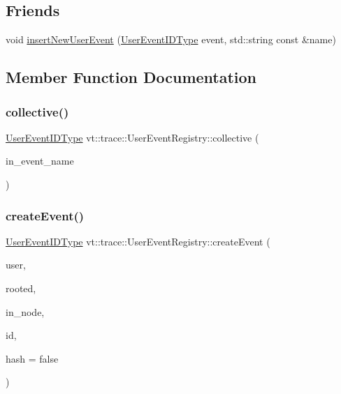 \subsection*{Friends}
\begin{DoxyCompactItemize}
\item 
void \hyperlink{structvt_1_1trace_1_1_user_event_registry_a17caa1eeb27fd6a4af8786a7f0679d77}{insert\+New\+User\+Event} (\hyperlink{namespacevt_1_1trace_a5908920d051c144c89f17c69ed262350}{User\+Event\+I\+D\+Type} event, std\+::string const \&name)
\end{DoxyCompactItemize}


\subsection{Member Function Documentation}
\mbox{\label{structvt_1_1trace_1_1_user_event_registry_a351d80d6d91bcd47e9fff0f6ed18df4d}} 
\subsubsection{\texorpdfstring{collective()}{collective()}}
{\footnotesize\ttfamily \hyperlink{namespacevt_1_1trace_a5908920d051c144c89f17c69ed262350}{User\+Event\+I\+D\+Type} vt\+::trace\+::\+User\+Event\+Registry\+::collective (\begin{DoxyParamCaption}\item[{std\+::string const \&}]{in\+\_\+event\+\_\+name }\end{DoxyParamCaption})}

\mbox{\label{structvt_1_1trace_1_1_user_event_registry_ac219431476480a6c9fe10ede067b33d2}} 
\subsubsection{\texorpdfstring{create\+Event()}{createEvent()}}
{\footnotesize\ttfamily \hyperlink{namespacevt_1_1trace_a5908920d051c144c89f17c69ed262350}{User\+Event\+I\+D\+Type} vt\+::trace\+::\+User\+Event\+Registry\+::create\+Event (\begin{DoxyParamCaption}\item[{bool}]{user,  }\item[{bool}]{rooted,  }\item[{\hyperlink{namespacevt_a866da9d0efc19c0a1ce79e9e492f47e2}{Node\+Type}}]{in\+\_\+node,  }\item[{\hyperlink{namespacevt_1_1trace_a70c43e0e1596eea236912d4197d3120a}{User\+Spec\+Event\+I\+D\+Type}}]{id,  }\item[{bool}]{hash = {\ttfamily false} }\end{DoxyParamCaption})}

